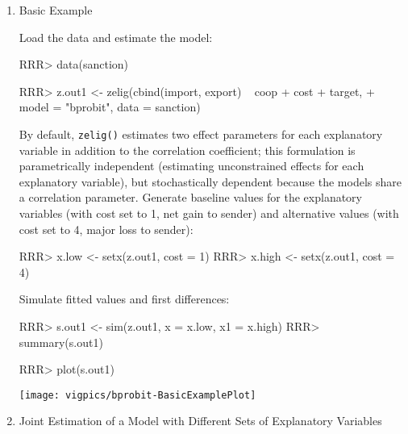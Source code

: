 \begin{enumerate}

\item {Basic Example} \label{basic.bp}

Load the data and estimate the model:  
\begin{Schunk}
\begin{Sinput}
RRR>  data(sanction)
\end{Sinput}
\end{Schunk}
\begin{Schunk}
\begin{Sinput}
RRR>  z.out1 <- zelig(cbind(import, export) ~ coop + cost + target, 
+                   model = "bprobit", data = sanction)
\end{Sinput}
\end{Schunk}
By default, {\tt zelig()} estimates two effect parameters
for each explanatory variable in addition to the correlation coefficient;
this formulation is parametrically independent (estimating
unconstrained effects for each explanatory variable), but
stochastically dependent because the models share a correlation parameter.
\newline \newline Generate baseline values for the explanatory
variables (with cost set to 1, net gain to sender) and alternative
values (with cost set to 4, major loss to sender):
\begin{Schunk}
\begin{Sinput}
RRR>  x.low <- setx(z.out1, cost = 1)
RRR>  x.high <- setx(z.out1, cost = 4)
\end{Sinput}
\end{Schunk}
Simulate fitted values and first differences:  
\begin{Schunk}
\begin{Sinput}
RRR>  s.out1 <- sim(z.out1, x = x.low, x1 = x.high)
RRR>  summary(s.out1)
\end{Sinput}
\end{Schunk}
\begin{center}
\begin{Schunk}
\begin{Sinput}
RRR>  plot(s.out1)
\end{Sinput}
\end{Schunk}
\texttt{[image: vigpics/bprobit-BasicExamplePlot]}
\end{center}


\item {Joint Estimation of a Model with Different Sets of Explanatory Variables}\label{sto.dep.probit}


\end{enumerate}
